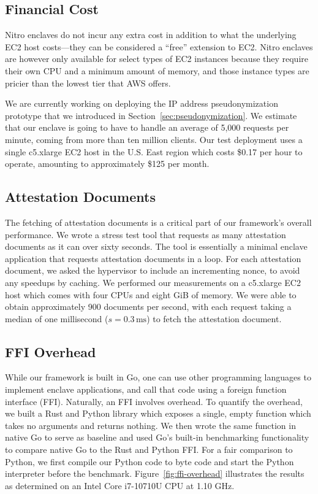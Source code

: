 \subsection{Financial Cost}
\label{sec:cost}

Nitro enclaves do not incur any extra cost in addition to what the underlying
EC2 host costs---they can be considered a ``free'' extension to EC2.  Nitro
enclaves are however only available for select types of EC2 instances because
they require their own CPU and a minimum amount of memory, and those instance
types are pricier than the lowest tier that AWS offers.

We are currently working on deploying the IP address pseudonymization prototype
that we introduced in Section~\ref{sec:pseudonymization}.  We estimate that our
enclave is going to have to handle an average of 5,000 requests per minute,
coming from more than ten million clients.  Our test deployment uses a single
c5.xlarge EC2 host in the U.S. East region which costs \$0.17 per hour to
operate, amounting to approximately \$125 per month.

\subsection{Attestation Documents}
\label{sec:attestation-performance}

The fetching of attestation documents is a critical part of our framework's
overall performance.  We wrote a stress test tool that requests as many
attestation documents as it can over sixty seconds.  The tool is essentially a
minimal enclave application that requests attestation documents in a loop.  For
each attestation document, we asked the hypervisor to include an incrementing
nonce, to avoid any speedups by caching.  We performed our measurements on a
c5.xlarge EC2 host which comes with four CPUs and eight GiB of memory.  We were
able to obtain approximately 900 documents per second, with each request taking
a median of one millisecond ($s = 0.3\,\text{ms}$) to fetch the attestation
document.

\subsection{FFI Overhead}
\label{sec:ffi-overhead}

While our framework is built in Go, one can use other programming languages to
implement enclave applications, and call that code using a foreign function
interface (FFI).  Naturally, an FFI involves overhead.  To quantify the
overhead, we built a Rust and Python library which exposes a single, empty
function which takes no arguments and returns nothing.  We then wrote the same
function in native Go to serve as baseline and used Go's built-in benchmarking
functionality to compare native Go to the Rust and Python FFI.  For a fair
comparison to Python, we first compile our Python code to byte code and start
the Python interpreter before the benchmark.  Figure~\ref{fig:ffi-overhead}
illustrates the results as determined on an Intel Core i7-10710U CPU at 1.10
GHz.

